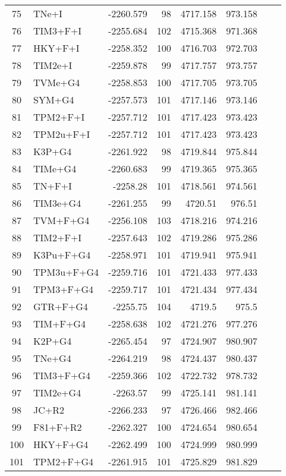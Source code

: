 \begin{longtable}{clrrrrrr}
	75 & TNe+I & -2260.579 & 98 & 4717.158 & 973.158 \\ 
	76 & TIM3+F+I & -2255.684 & 102 & 4715.368 & 971.368 \\ 
	77 & HKY+F+I & -2258.352 & 100 & 4716.703 & 972.703 \\ 
	78 & TIM2e+I & -2259.878 & 99 & 4717.757 & 973.757 \\ 
	79 & TVMe+G4 & -2258.853 & 100 & 4717.705 & 973.705 \\ 
	80 & SYM+G4 & -2257.573 & 101 & 4717.146 & 973.146 \\ 
	81 & TPM2+F+I & -2257.712 & 101 & 4717.423 & 973.423 \\ 
	82 & TPM2u+F+I & -2257.712 & 101 & 4717.423 & 973.423 \\ 
	83 & K3P+G4 & -2261.922 & 98 & 4719.844 & 975.844 \\ 
	84 & TIMe+G4 & -2260.683 & 99 & 4719.365 & 975.365 \\ 
	85 & TN+F+I & -2258.28 & 101 & 4718.561 & 974.561 \\ 
	86 & TIM3e+G4 & -2261.255 & 99 & 4720.51 & 976.51 \\ 
	87 & TVM+F+G4 & -2256.108 & 103 & 4718.216 & 974.216 \\ 
	88 & TIM2+F+I & -2257.643 & 102 & 4719.286 & 975.286 \\ 
	89 & K3Pu+F+G4 & -2258.971 & 101 & 4719.941 & 975.941 \\ 
	90 & TPM3u+F+G4 & -2259.716 & 101 & 4721.433 & 977.433 \\ 
	91 & TPM3+F+G4 & -2259.717 & 101 & 4721.434 & 977.434 \\ 
	92 & GTR+F+G4 & -2255.75 & 104 & 4719.5 & 975.5 \\ 
	93 & TIM+F+G4 & -2258.638 & 102 & 4721.276 & 977.276 \\ 
	94 & K2P+G4 & -2265.454 & 97 & 4724.907 & 980.907 \\ 
	95 & TNe+G4 & -2264.219 & 98 & 4724.437 & 980.437 \\ 
	96 & TIM3+F+G4 & -2259.366 & 102 & 4722.732 & 978.732 \\ 
	97 & TIM2e+G4 & -2263.57 & 99 & 4725.141 & 981.141 \\ 
	98 & JC+R2 & -2266.233 & 97 & 4726.466 & 982.466 \\ 
	99 & F81+F+R2 & -2262.327 & 100 & 4724.654 & 980.654 \\ 
	100 & HKY+F+G4 & -2262.499 & 100 & 4724.999 & 980.999 \\ 
	101 & TPM2+F+G4 & -2261.915 & 101 & 4725.829 & 981.829 \\ 

\end{longtable}
